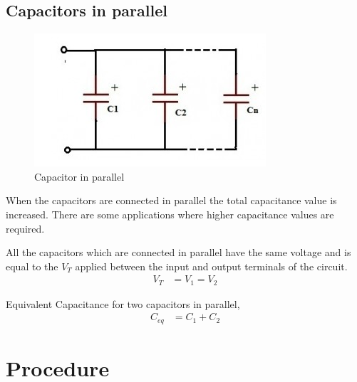 		\subsection{Capacitors in parallel}
			\begin{figure}[h]
				\centering
				\includegraphics[width=0.5\linewidth]{img/exp2/11}
				\caption{Capacitor in parallel}
				\label{fig:capsInParallel}
			\end{figure}
			When the capacitors are connected in parallel the total capacitance value is increased. There are some applications where higher capacitance values are required.
			
			All the capacitors which are connected in parallel have the same voltage and is equal to the $V_T$ applied between the input and output terminals of the circuit.
			\begin{align*}
				V_T &= V_1 = V_2
			\end{align*}
			
			Equivalent Capacitance for two capacitors in parallel,
			\begin{align*}
				C_{eq} &= C_1 + C_2
			\end{align*}
		
	\section{Procedure}
